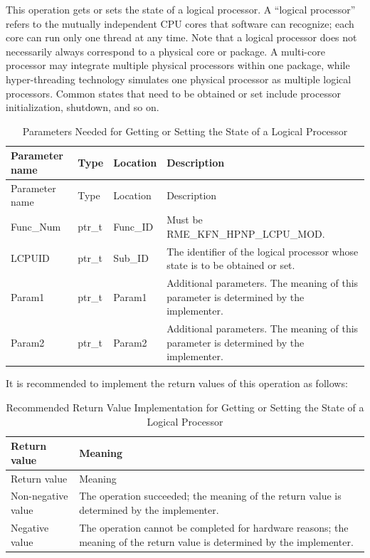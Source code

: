 This operation gets or sets the state of a logical processor. A ``logical processor'' refers to the mutually independent CPU cores that software can recognize; each core can run only one thread at any time. Note that a logical processor does not necessarily always correspond to a physical core or package. A multi-core processor may integrate multiple physical processors within one package, while hyper-threading technology simulates one physical processor as multiple logical processors. Common states that need to be obtained or set include processor initialization, shutdown, and so on.

\begin{xltabular}{\textwidth}{@{}>{\hsize\raggedright\arraybackslash}X>{\hsize\raggedright\arraybackslash}X>{\hsize\raggedright\arraybackslash}X>{\hsize\raggedright\arraybackslash}X@{}}
\caption{Parameters Needed for Getting or Setting the State of a Logical Processor}\label{tab:8-38-get-or-set-logical-processor-state-parameters}\\
\toprule
Parameter name & Type & Location & Description\tabularnewline
\endfirsthead
\toprule
Parameter name & Type & Location & Description\tabularnewline
\midrule
\endhead
\bottomrule
\endlastfoot
Func\_Num & ptr\_t & Func\_ID & Must be RME\_KFN\_HPNP\_LCPU\_MOD.\tabularnewline
LCPUID & ptr\_t & Sub\_ID &
The identifier of the logical processor whose state is to be obtained or set.\tabularnewline
Param1 & ptr\_t & Param1 &
Additional parameters. The meaning of this parameter is determined by the implementer.\tabularnewline
Param2 & ptr\_t & Param2 &
Additional parameters. The meaning of this parameter is determined by the implementer.\tabularnewline
\end{xltabular}
\nopagebreak[4]

It is recommended to implement the return values of this operation as follows:

\begin{xltabular}{\textwidth}{@{}>{\hsize\raggedright\arraybackslash}X>{\hsize\raggedright\arraybackslash}X@{}}
\caption{Recommended Return Value Implementation for Getting or Setting the State of a Logical Processor}\label{tab:8-39-get-or-set-logical-processor-state-suggested-return-values}\\
\toprule
Return value & Meaning\tabularnewline
\endfirsthead
\toprule
Return value & Meaning\tabularnewline
\midrule
\endhead
\bottomrule
\endlastfoot
    Non-negative value & The operation succeeded; the meaning of the return value is determined by the implementer.\tabularnewline
    Negative value & The operation cannot be completed for hardware reasons; the meaning of the return value is determined by the implementer.\tabularnewline
\end{xltabular}
\nopagebreak[4]


